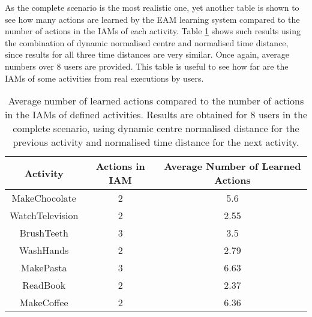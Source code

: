 As the complete scenario is the most realistic one, yet another table is shown to see how many actions are learned by the EAM learning system compared to the number of actions in the IAMs of each activity. Table \ref{tab-avg-actions-comp-t2} shows such results using the combination of dynamic normalised centre and normalised time distance, since results for all three time distances are very similar. Once again, average numbers over 8 users are provided. This table is useful to see how far are the IAMs of some activities from real executions by users.


\begin{table}[htbp]\scriptsize
  \begin{center}
        \begin{tabular}{ccc}
            \hline            
            \textbf{Activity} & \textbf{Actions in IAM} & \textbf{Average Number of Learned Actions} \\             
            \hline
            MakeChocolate   & 2 & 5.6 \\
	    WatchTelevision & 2 & 2.55 \\
	    BrushTeeth      & 3 & 3.5 \\
	    WashHands       & 2 & 2.79 \\
	    MakePasta       & 3 & 6.63 \\
	    ReadBook        & 2 & 2.37 \\
	    MakeCoffee      & 2 & 6.36 \\
            \hline
        \end{tabular}                
        \caption{Average number of learned actions compared to the number of actions in the IAMs of defined activities. Results are obtained for 8 users in the complete scenario, using dynamic centre normalised distance for the previous activity and normalised time distance for the next activity.}
        \label{tab-avg-actions-comp-t2}
    \end{center}
\end{table}